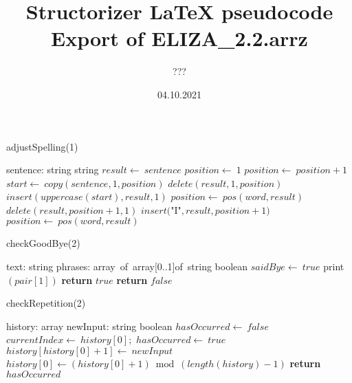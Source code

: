 \documentclass[a4paper,10pt]{article}
\title{Structorizer LaTeX pseudocode Export of ELIZA\_2.2.arrz}
\author{???}
\date{04.10.2021}
\begin{document}
\begin{algorithm}
\caption{adjustSpelling(1)}
\begin{algorithmic}[5]
\State {}
    \State sentence: string
  \EndDecl
    \State string
  \EndDecl
  \State \(result\gets\ sentence\)
  \State \(position\gets\ 1\)
    \State \(position\gets\ position+1\)
  \EndWhile
    \State \(start\gets\ copy(sentence,1,position)\)
    \State \(delete(result,1,position)\)
    \State \(insert(uppercase(start),result,1)\)
  \EndIf
    \State \(position\gets\ pos(word,result)\)
      \State \(delete(result,position+1,1)\)
      \State \(insert(\)"{}I"{}\(,result,position+1)\)
      \State \(position\gets\ pos(word,result)\)
    \EndWhile
  \EndFor
\EndFunction
\end{algorithmic}
\end{algorithm}


\begin{algorithm}
\caption{checkGoodBye(2)}
\begin{algorithmic}[5]
\State {}
\State {}
\State {}
\State {}
    \State text: string
    \State phrases: array\ of\ array[0..1]of\ string
  \EndDecl
    \State boolean
  \EndDecl
      \State \(saidBye\gets\ true\)
      \State \(\)print\((pair[1])\)
      \State \textbf{return} \(true\)
    \EndIf
  \EndFor
  \State \textbf{return} \(false\)
\EndFunction
\end{algorithmic}
\end{algorithm}


\begin{algorithm}
\caption{checkRepetition(2)}
\begin{algorithmic}[5]
\State {}
\State {}
    \State history: array
    \State newInput: string
  \EndDecl
    \State boolean
  \EndDecl
  \State \(hasOccurred\gets\ false\)
    \State \(currentIndex\gets\ history[0];\)
        \State \(hasOccurred\gets\ true\)
      \EndIf
    \EndFor
    \State \(history[history[0]+1]\gets\ newInput\)
    \State \(history[0]\gets(history[0]+1)\bmod(length(history)-1)\)
  \EndIf
  \State \textbf{return} \(hasOccurred\)
\EndFunction
\end{algorithmic}
\end{algorithm}
\end{document}
